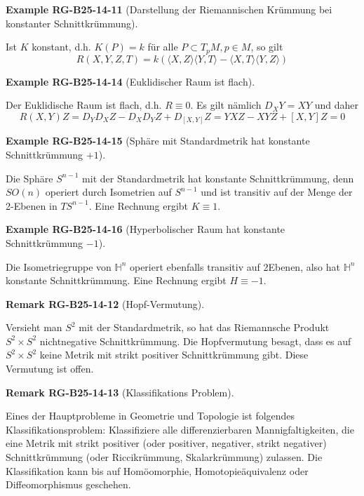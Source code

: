 \documentclass[10pt, letterpaper]{article}
\newcommand{\CustomHeading}[3]{%
  \par\medskip\noindent%
  \textbf{#1 #2} \textnormal{(#3)}.\enskip%
}
\newenvironment{REM}[2]{\begin{unitbox}\CustomHeading{Remark}{#1}{#2}}{\end{unitbox}}
\newenvironment{EXA}[2]{\begin{unitbox}\CustomHeading{Example}{#1}{#2}}{\end{unitbox}}
\begin{document}
\begin{EXA}{RG-B25-14-11}{Darstellung der Riemannischen Krümmung bei konstanter Schnittkrümmung}
Ist $K$ konstant, d.h. $K(P)=k$ für alle $P \subset T_{p} M, p \in M$, so gilt
$$
R(X, Y, Z, T)=k(\langle X, Z\rangle\langle Y, T\rangle-\langle X, T\rangle\langle Y, Z\rangle)
$$
\end{EXA}


\begin{EXA}{RG-B25-14-14}{Euklidischer Raum ist flach}
Der Euklidische Raum ist flach, d.h. $R \equiv 0$. Es gilt nämlich $D_{X} Y=X Y$ und daher
$$R(X, Y) Z=D_{Y} D_{X} Z-D_{X} D_{Y} Z+D_{[X, Y]} Z=Y X Z-X Y Z+[X, Y] Z=0$$
\end{EXA}
 
 
\begin{EXA}{RG-B25-14-15}{Sphäre mit Standardmetrik hat konstante Schnittkrümmung $+1$}
Die Sphäre $S^{n-1}$ mit der Standardmetrik hat konstante Schnittkrümmung, denn $S O(n)$ operiert durch Isometrien auf $S^{n-1}$ und ist transitiv auf der Menge der 2-Ebenen in $T S^{n-1}$. Eine Rechnung ergibt $K \equiv 1$.
\end{EXA}


\begin{EXA}{RG-B25-14-16}{Hyperbolischer Raum hat konstante Schnittkrümmung $-1$}
Die Isometriegruppe von $\mathbb{H}^{n}$ operiert ebenfalls transitiv auf 2Ebenen, also hat $\mathbb{H}^{n}$ konstante Schnittkrümmung. Eine Rechnung ergibt $H \equiv-1$.
\end{EXA}

\begin{REM}{RG-B25-14-12}{Hopf-Vermutung}
Versieht man $S^{2}$ mit der Standardmetrik, so hat das Riemannsche Produkt $S^{2} \times S^{2}$ nichtnegative Schnittkrümmung. Die Hopfvermutung besagt, dass es auf $S^{2} \times S^{2}$ keine Metrik mit strikt positiver Schnittkrümmung gibt. Diese Vermutung ist offen.
\end{REM}

\begin{REM}{RG-B25-14-13}{Klassifikations Problem}
Eines der Hauptprobleme in Geometrie und Topologie ist folgendes Klassifikationsproblem: Klassifiziere alle differenzierbaren Mannigfaltigkeiten, die eine Metrik mit strikt positiver (oder positiver, negativer, strikt negativer) Schnittkrümmung (oder Riccikrümmung, Skalarkrümmung) zulassen. Die Klassifikation kann bis auf Homöomorphie, Homotopieäquivalenz oder Diffeomorphismus geschehen.
\end{REM}
\end{document}
